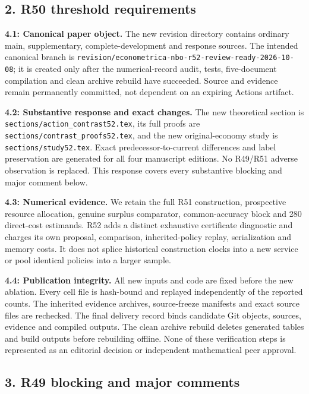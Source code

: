 \hypertarget{r50-threshold-requirements}{%
\subsection{2. R50 threshold
requirements}\label{r50-threshold-requirements}}

\textbf{4.1: Canonical paper object.} The new revision directory
contains ordinary main, supplementary, complete-development and response
sources. The intended canonical branch is
\texttt{revision/econometrica-nbo-r52-review-ready-2026-10-08}; it is
created only after the numerical-record audit, tests, five-document
compilation and clean archive rebuild have succeeded. Source and
evidence remain permanently committed, not dependent on an expiring
Actions artifact.

\textbf{4.2: Substantive response and exact changes.} The new
theoretical section is \texttt{sections/action\_contrast52.tex}, its
full proofs are \texttt{sections/contrast\_proofs52.tex}, and the new
original-economy study is \texttt{sections/study52.tex}. Exact
predecessor-to-current differences and label preservation are generated
for all four manuscript editions. No R49/R51 adverse observation is
replaced. This response covers every substantive blocking and major
comment below.

\textbf{4.3: Numerical evidence.} We retain the full R51 construction,
prospective resource allocation, genuine surplus comparator,
common-accuracy block and 280 direct-cost estimands. R52 adds a distinct
exhaustive certificate diagnostic and charges its own proposal,
comparison, inherited-policy replay, serialization and memory costs. It
does not splice historical construction clocks into a new service or
pool identical policies into a larger sample.

\textbf{4.4: Publication integrity.} All new inputs and code are fixed
before the new ablation. Every cell file is hash-bound and replayed
independently of the reported counts. The inherited evidence archives,
source-freeze manifests and exact source files are rechecked. The final
delivery record binds candidate Git objects, sources, evidence and
compiled outputs. The clean archive rebuild deletes generated tables and
build outputs before rebuilding offline. None of these verification
steps is represented as an editorial decision or independent
mathematical peer approval.

\hypertarget{r49-blocking-and-major-comments}{%
\subsection{3. R49 blocking and major
comments}\label{r49-blocking-and-major-comments}}

